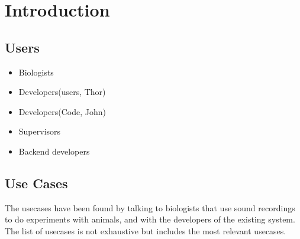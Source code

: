 \chapter{Introduction}


\section{Users}

\begin{itemize}
	\item Biologists
	\item Developers(users, Thor)
	\item Developers(Code, John)
	\item Supervisors
	\item Backend developers
\end{itemize}

\section{Use Cases}
The usecases have been found by talking to biologists that use sound recordings to do experiments with animals, and with the developers of the existing system. The list of usecases is not exhaustive but includes the most relevant usecases.

